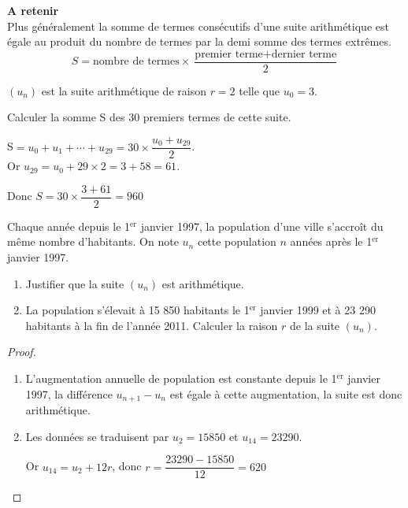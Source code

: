     \medskip
   \textbf{\color{blue}A retenir}\\ 
 Plus généralement la somme de termes consécutifs d'une suite arithmétique est égale au produit du nombre de termes  par la demi somme des termes extrêmes.
   \[ S=\text{nombre  de termes}\times\dfrac{\text{premier terme}+\text{dernier terme} }{2} \]
   \begin{example}
   
   $ (u_n) $  est la suite arithmétique de raison $ r=2 $  telle que $ u_0=3 $.
   
   Calculer  la somme   S des 30 premiers  termes de cette suite.
   
   \medskip
   
   S$ =u_0+u_1+\cdots +u_{29}= 30\times \dfrac{u_0+u_{29}}{2}$.\\
   Or $ u_{29}=u_0+  29\times 2=3+58=61 $.
   
   Donc $ S=30 \times \dfrac{3+61}{2}=960 $
    \end{example}
  

   
\begin{example}
           
           
            Chaque année depuis le  1$^{\text{er}} $ janvier  1997, la population d'une ville  s'accroît du même  nombre d'habitants. On note $ u_n $   cette population  $ n $  années après  le  1$^{\text{er}} $  janvier  1997.
           \begin{enumerate}
           \item Justifier que la suite   $ (u_n) $ est arithmétique.
           \item  La population  s'élevait à 15 850 habitants  le 1$^{\text{er}} $  janvier  1999  et à 23 290  habitants à la fin de l'année 2011.  Calculer la raison $ r $ de la suite $ (u_n) $.
           \end{enumerate}
            \end{example}
           \bigskip
           
   \begin{proof}
   
   \begin{enumerate}
   \item L'augmentation annuelle  de population  est constante   depuis le  1$^{\text{er}} $  janvier  1997, la différence $ u_{n+1}-u_n $  est égale à cette augmentation, la suite est donc arithmétique.
   \item Les données se traduisent par $ u_2= 15 850$  et $ u_{14}= 23 290$.
   
   \bigskip
   Or $ u_{14}=u_{2} +12r$, donc $ r=\dfrac{23 290- 15 850}{12}=620$
   \end{enumerate}
\end{proof}


